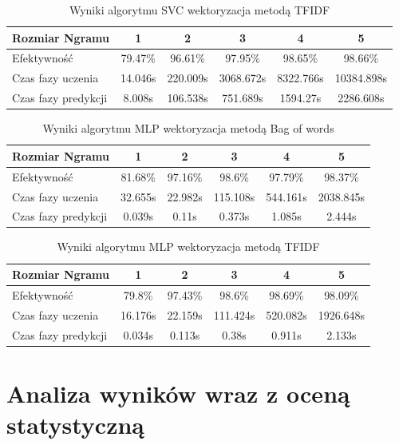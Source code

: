 \begin{table}[H]
    \centering
    \caption{Wyniki algorytmu SVC wektoryzacja metodą TFIDF}
    \begin{tabular}{ | l | c | c | c | c | c |}
        \hline
        Rozmiar Ngramu & 1 & 2 & 3 & 4 & 5   \\ \hline
        Efektywność & 79.47\% & 96.61\% & 97.95\% & 98.65\% & 98.66\% \\ \hline
        Czas fazy uczenia & 14.046s & 220.009s & 3068.672s & 8322.766s & 10384.898s \\ \hline
        Czas fazy predykcji & 8.008s & 106.538s & 751.689s & 1594.27s & 2286.608s  \\ \hline
    \end{tabular}
\end{table}

\begin{table}[H]
    \centering
    \caption{Wyniki algorytmu MLP wektoryzacja metodą Bag of words}
    \begin{tabular}{ | l | c | c | c | c | c |}
        \hline
        Rozmiar Ngramu & 1 & 2 & 3 & 4 & 5  \\ \hline
        Efektywność & 81.68\% & 97.16\% & 98.6\% & 97.79\% & 98.37\%   \\ \hline
        Czas fazy uczenia & 32.655s & 22.982s & 115.108s & 544.161s & 2038.845s  \\ \hline
        Czas fazy predykcji & 0.039s & 0.11s & 0.373s & 1.085s & 2.444s  \\ \hline
    \end{tabular}
\end{table}

\begin{table}[H]
    \centering
    \caption{Wyniki algorytmu MLP wektoryzacja metodą TFIDF}
    \begin{tabular}{ | l | c | c | c | c | c |}
        \hline
        Rozmiar Ngramu & 1 & 2 & 3 & 4 & 5   \\ \hline
        Efektywność & 79.8\% & 97.43\% & 98.6\% & 98.69\% & 98.09\%   \\ \hline
        Czas fazy uczenia & 16.176s & 22.159s & 111.424s & 520.082s & 1926.648s  \\ \hline
        Czas fazy predykcji & 0.034s & 0.113s & 0.38s & 0.911s & 2.133s  \\ \hline
    \end{tabular}
\end{table}
\section{Analiza wyników wraz z oceną statystyczną}

